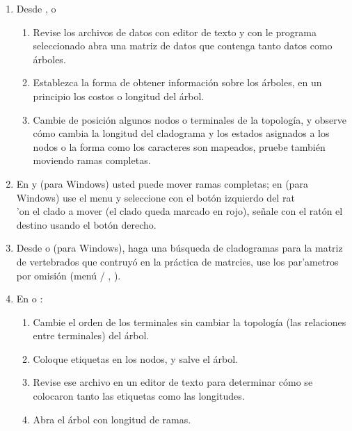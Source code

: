 \begin{enumerate}

	\item Desde ,  o 
	\begin{enumerate}
		\item Revise los archivos de datos con editor de texto y con le programa seleccionado abra una matriz de datos que contenga tanto datos como \'arboles.
		\item Establezca la forma de obtener informaci\'on sobre los \'arboles, en un principio los costos o longitud del \'arbol.
		\item Cambie de posici\'on algunos nodos o terminales de la topolog\'ia, y observe c\'omo cambia la longitud del cladograma y los estados asignados a los nodos o la forma como los caracteres son mapeados, pruebe tambi\'en moviendo ramas completas.
	\end{enumerate}

	\item En  y  (para Windows) usted puede mover ramas completas; en  (para Windows) use el menu  y seleccione con el bot\'on izquierdo del rat\\'on el clado a mover (el clado queda marcado en rojo), se\~nale con el rat\'on el destino usando el bot\'on derecho.
	\item Desde  o  (para Windows), haga una b\'usqueda de cladogramas para la matriz de vertebrados que contruy\'o en la pr\'actica de matrcies, use los par'ametros por omisi\'on (men\'u  / , ).
	\item En  o :
	\begin{enumerate}
		\item Cambie el orden de los terminales sin cambiar la topolog\'ia (las relaciones entre terminales) del \'arbol.
		\item Coloque etiquetas en los nodos, y salve el \'arbol.
		\item Revise ese archivo en un editor de texto para determinar c\'omo se colocaron tanto las etiquetas como las longitudes.
		\item Abra el \'arbol con longitud de ramas.
	\end{enumerate}



\end{enumerate}
